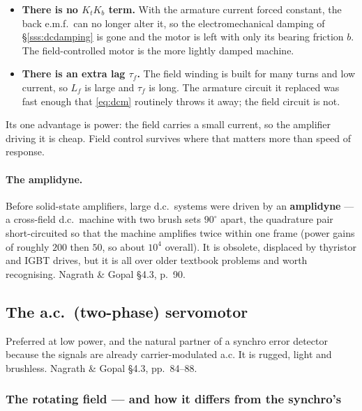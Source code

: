 \documentclass[11pt,a4paper]{article}
\begin{document}
\begin{itemize}[leftmargin=1.5em,itemsep=2pt]
\item \textbf{There is no $K_{t}K_{b}$ term.} With the armature current forced
      constant, the back e.m.f.\ can no longer alter it, so the
      electromechanical damping of \S\ref{sss:dcdamping} is gone and the motor
      is left with only its bearing friction $b$. The field-controlled motor is
      the more lightly damped machine.
\item \textbf{There is an extra lag $\tau_{f}$.} The field winding is built for
      many turns and low current, so $L_{f}$ is large and $\tau_{f}$ is long.
      The armature circuit it replaced was fast enough that
      \eqref{eq:dcm} routinely throws it away; the field circuit is not.
\end{itemize}

Its one advantage is power: the field carries a small current, so the amplifier
driving it is cheap. Field control survives where that matters more than
speed of response.

\paragraph{The amplidyne.} Before solid-state amplifiers, large d.c.\ systems
were driven by an \textbf{amplidyne} --- a cross-field d.c.\ machine with two
brush sets $90^\circ$ apart, the quadrature pair short-circuited so that the
machine amplifies twice within one frame (power gains of roughly $200$ then
$50$, so about $10^{4}$ overall). It is obsolete, displaced by thyristor and
IGBT drives, but it is all over older textbook problems and worth recognising.
Nagrath \& Gopal \S4.3, p.~90.

\subsection{The a.c.\ (two-phase) servomotor}

Preferred at low power, and the natural partner of a synchro error detector
because the signals are already carrier-modulated a.c. It is rugged, light and
brushless. Nagrath \& Gopal \S4.3, pp.~84--88.

\subsubsection{The rotating field --- and how it differs from the synchro's}
\label{sss:rotating}
\end{document}
